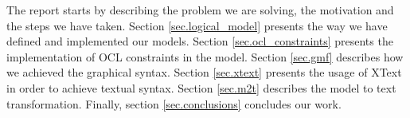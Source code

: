 \noindent The report starts by describing the problem we are solving, the
motivation and the steps we have taken. Section \ref{sec.logical_model}
presents the way we have defined and implemented our models. Section
\ref{sec.ocl_constraints} presents the implementation of OCL constraints in the
model. Section \ref{sec.gmf} describes how we achieved the graphical syntax.
Section \ref{sec.xtext} presents the usage of XText in order to achieve textual
syntax. Section \ref{sec.m2t} describes the model to text transformation.
Finally, section \ref{sec.conclusions} concludes our work.
